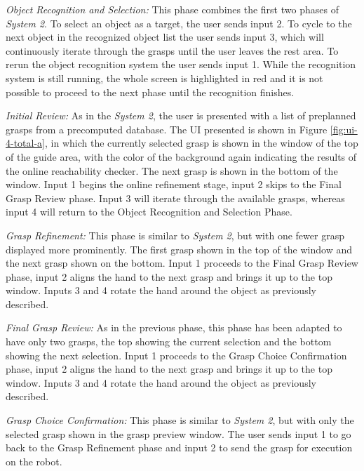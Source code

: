 \emph{Object Recognition and Selection:} This phase combines the first two phases of \emph{System 2}. To select an object as a target, the user sends input 2. To cycle to the next object in the recognized object list the user sends input 3, which will continuously iterate through the grasps until the user leaves the rest area. To rerun the object recognition system the user sends input 1. While the recognition system is still running, the whole screen is highlighted in red and it is not possible to proceed to the next phase until the recognition finishes. 

\emph{Initial Review:} As in the \emph{System 2}, the user is presented with a list of preplanned grasps from a precomputed database. The UI presented is shown in Figure \ref{fig:ui-4-total-a}, in which the currently selected grasp is shown in the window of the top of the guide area, with the color of the background again indicating the results of the online reachability checker. The next grasp is shown in the bottom of the window. Input 1 begins the online refinement stage, input 2 skips to the Final Grasp Review phase. Input 3 will iterate through the available grasps, whereas input 4 will return to the Object Recognition and Selection Phase.

\emph{Grasp Refinement:} This phase is similar to \emph{System 2}, but with one fewer grasp displayed more prominently. The first grasp shown in the top of the window and the next grasp shown on the bottom. Input 1 proceeds to the Final Grasp Review phase, input 2 aligns the hand to the next grasp and brings it up to the top window. Inputs 3 and 4 rotate the hand around the object as previously described. 

\emph{Final Grasp Review:} As in the previous phase, this phase has been adapted to have only two grasps, the top showing the current selection and the bottom showing the next selection. Input 1 proceeds to the Grasp Choice Confirmation phase, input 2 aligns the hand to the next grasp and brings it up to the top window. Inputs 3 and 4 rotate the hand around the object as previously described. 

\emph{Grasp Choice Confirmation:} This phase is similar to \emph{System 2}, but with only the selected grasp shown in the grasp preview window. The user sends input 1 to go back to the Grasp Refinement phase and input 2 to send the grasp for execution on the robot.

